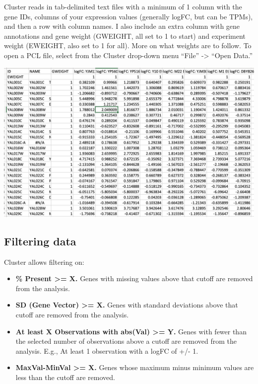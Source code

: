 \documentclass[
]{book}
\begin{document}
Cluster reads in tab-delimited text files with a minimum of 1 column with the gene IDs, columns of your expression values (generally logFC, but can be TPMs), and then a row with column names. I also include an extra column with gene annotations and gene weight (GWEIGHT, all set to 1 to start) and experiment weight (EWEIGHT, also set to 1 for all). More on what weights are to follow. To open a PCL file, select from the Cluster drop-down menu ``File'' -\textgreater{} ``Open Data.''

\includegraphics[width=20.31in]{figures/PCL_File}

\hypertarget{filtering-data}{%
\subsection{Filtering data}\label{filtering-data}}

Cluster allows filtering on:

\begin{itemize}
\item
  \textbf{\% Present \textgreater= X.} Genes with missing values above that cutoff are removed from the analysis.
\item
  \textbf{SD (Gene Vector) \textgreater= X.} Genes with standard deviations above that cutoff are removed from the analysis.
\item
  \textbf{At least X Observations with abs(Val) \textgreater= Y.} Genes with fewer than the selected number of observations above a cutoff are removed from the analysis. E.g., At least 1 observation with a logFC of +/- 1.
\item
  \textbf{MaxVal-MinVal \textgreater= X.} Genes whose maximum minus minimum values are less than the cutoff are removed.
\end{itemize}
\end{document}
